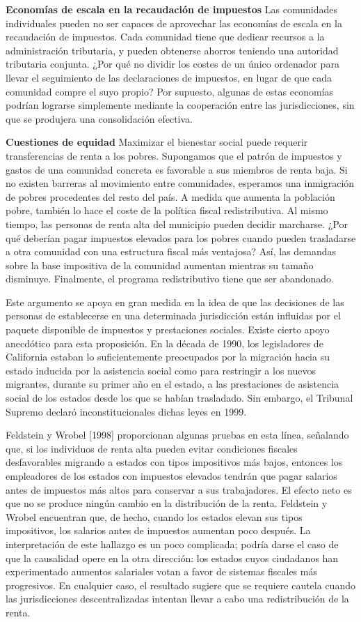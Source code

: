 \documentclass[10pt,a4paper]{article}
\begin{document}
\textbf{Economías de escala en la recaudación de impuestos}
Las comunidades individuales pueden no ser capaces de aprovechar las economías de escala en la recaudación de impuestos. Cada comunidad tiene que dedicar recursos a la administración tributaria, y pueden obtenerse ahorros teniendo una autoridad tributaria conjunta. ¿Por qué no dividir los costes de un único ordenador para llevar el seguimiento de las declaraciones de impuestos, en lugar de que cada comunidad compre el suyo propio? Por supuesto, algunas de estas economías podrían lograrse simplemente mediante la cooperación entre las jurisdicciones, sin que se produjera una consolidación efectiva. 

\textbf{Cuestiones de equidad} 
Maximizar el bienestar social puede requerir transferencias de renta a los pobres. Supongamos que el patrón de impuestos y gastos de una comunidad concreta es favorable a sus miembros de renta baja. Si no existen barreras al movimiento entre comunidades, esperamos una inmigración de pobres procedentes del resto del país. A medida que aumenta la población pobre, también lo hace el coste de la política fiscal redistributiva. Al mismo tiempo, las personas de renta alta del municipio pueden decidir marcharse. ¿Por qué deberían pagar impuestos elevados para los pobres cuando pueden trasladarse a otra comunidad con una estructura fiscal más ventajosa? Así, las demandas sobre la base impositiva de la comunidad aumentan mientras su tamaño disminuye. Finalmente, el programa redistributivo tiene que ser abandonado.

Este argumento se apoya en gran medida en la idea de que las decisiones de las personas de establecerse en una determinada jurisdicción están influidas por el paquete disponible de impuestos y prestaciones sociales. Existe cierto apoyo anecdótico para esta proposición. En la década de 1990, los legisladores de California estaban lo suficientemente preocupados por la migración hacia su estado inducida por la asistencia social como para restringir a los nuevos migrantes, durante su primer año en el estado, a las prestaciones de asistencia social de los estados desde los que se habían trasladado. Sin embargo, el Tribunal Supremo declaró inconstitucionales dichas leyes en 1999.

Feldstein y Wrobel [1998] proporcionan algunas pruebas en esta línea, señalando que, si los individuos de renta alta pueden evitar condiciones fiscales desfavorables migrando a estados con tipos impositivos más bajos, entonces los empleadores de los estados con impuestos elevados tendrán que pagar salarios antes de impuestos más altos para conservar a sus trabajadores. El efecto neto es que no se produce ningún cambio en la distribución de la renta. Feldstein y Wrobel encuentran que, de hecho, cuando los estados elevan sus tipos impositivos, los salarios antes de impuestos aumentan poco después. La interpretación de este hallazgo es un poco complicada; podría darse el caso de que la causalidad opere en la otra dirección: los estados cuyos ciudadanos han experimentado aumentos salariales votan a favor de sistemas fiscales más progresivos. En cualquier caso, el resultado sugiere que se requiere cautela cuando las jurisdicciones descentralizadas intentan llevar a cabo una redistribución de la renta.
\end{document}
